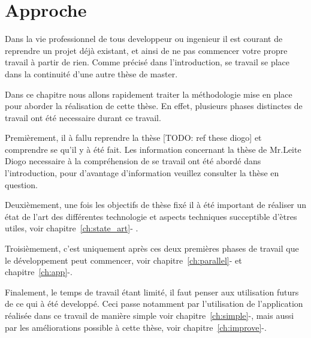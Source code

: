 \chapter{Approche}
\label{ch:approche}

Dans la vie professionnel de tous developpeur ou ingenieur il est courant de reprendre un projet déjà existant, et ainsi de ne pas commencer votre propre travail à partir de rien. Comme précisé dans l'introduction, se travail se place dans la continuité d'une autre thèse de master.

Dans ce chapitre nous allons rapidement traiter la méthodologie mise en place pour aborder la réalisation de cette thèse. En effet, plusieurs phases distinctes de travail ont été necessaire durant ce travail.

Premièrement, il à fallu reprendre la thèse [TODO: ref these diogo] et comprendre se qu'il y à été fait. Les information concernant la thèse de Mr.Leite Diogo necessaire à la compréhension de se travail ont été abordé dans l'introduction, pour d'avantage d'information veuillez consulter la thèse en question.

Deuxièmement, une fois les objectifs de thèse fixé il à été important de réaliser un état de l'art des différentes technologie et aspects techniques succeptible d'ètres utiles, voir chapitre~\ref{ch:state_art}- .

Troisièmement, c'est uniquement après ces deux premières phases de travail que le développement peut commencer, voir chapitre~\ref{ch:parallel}- et chapitre~\ref{ch:app}-.

Finalement, le temps de travail étant limité, il faut penser aux utilisation futurs de ce qui à été developpé. Ceci passe notamment par l'utilisation de l'application réalisée dans ce travail de manière simple voir chapitre~\ref{ch:simple}-, mais aussi par les améliorations possible à cette thèse, voir chapitre~\ref{ch:improve}-.

